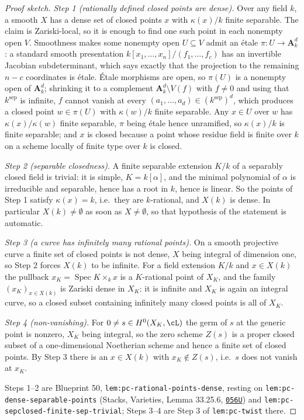 \documentclass[11pt]{article}
\theoremstyle{plain}
\theoremstyle{definition}
\DeclareMathOperator{\Spec}{Spec}
\begin{document}
\begin{proof}[Proof sketch]
\emph{Step 1 (rationally defined closed points are dense).}  Over any
field $k$, a smooth $X$ has a dense set of closed points $x$ with
$\kappa(x)/k$ finite separable.  The claim is Zariski-local, so it is
enough to find one such point in each nonempty open $V$.  Smoothness
makes some nonempty open $U\subseteq V$ admit an \'etale
$\pi:U\to\mathbf A^d_k$:  a standard smooth presentation
$k[x_1,\dots,x_n]/(f_1,\dots,f_c)$ has an invertible Jacobian
subdeterminant, which says exactly that the projection to the remaining
$n-c$ coordinates is \'etale.  \'Etale morphisms are open, so $\pi(U)$
is a nonempty open of $\mathbf A^d_k$;  shrinking it to a complement
$\mathbf A^d_k\setminus V(f)$ with $f\ne0$ and using that
$k^{\mathrm{sep}}$ is infinite, $f$ cannot vanish at every
$(a_1,\dots,a_d)\in(k^{\mathrm{sep}})^d$, which produces a closed point
$w\in\pi(U)$ with $\kappa(w)/k$ finite separable.  Any $x\in U$ over $w$
has $\kappa(x)/\kappa(w)$ finite separable, $\pi$ being \'etale hence
unramified, so $\kappa(x)/k$ is finite separable;  and $x$ is closed
because a point whose residue field is finite over $k$ on a scheme
locally of finite type over $k$ is closed.

\emph{Step 2 (separable closedness).}  A finite separable extension
$K/k$ of a separably closed field is trivial:  it is simple,
$K=k[\alpha]$, and the minimal polynomial of $\alpha$ is irreducible and
separable, hence has a root in $k$, hence is linear.  So the points of
Step 1 satisfy $\kappa(x)=k$, i.e.\ they are $k$-rational, and $X(k)$ is
dense.  In particular $X(k)\ne\emptyset$ as soon as $X\ne\emptyset$, so
that hypothesis of the statement is automatic.

\emph{Step 3 (a curve has infinitely many rational points).}  On a
smooth projective curve a finite set of closed points is not dense, $X$
being integral of dimension one, so Step 2 forces $X(k)$ to be infinite.
For a field extension $K/k$ and $x\in X(k)$ the pullback
$x_K=\Spec K\times_kx$ is a $K$-rational point of $X_K$, and the family
$(x_K)_{x\in X(k)}$ is Zariski dense in $X_K$:  it is infinite and $X_K$
is again an integral curve, so a closed subset containing infinitely
many closed points is all of $X_K$.

\emph{Step 4 (non-vanishing).}  For $0\ne s\in H^0(X_K,\cL)$ the germ of
$s$ at the generic point is nonzero, $X_K$ being integral, so the zero
scheme $Z(s)$ is a proper closed subset of a one-dimensional Noetherian
scheme and hence a finite set of closed points.  By Step 3 there is an
$x\in X(k)$ with $x_K\notin Z(s)$, i.e.\ $s$ does not vanish at $x_K$.

Steps 1--2 are Blueprint 50, \texttt{lem:pc-rational-points-dense},
resting on \texttt{lem:pc-dense-separable-points} (Stacks, Varieties,
Lemma 33.25.6, \href{https://stacks.math.columbia.edu/tag/056U}{\texttt{056U}}) and
\texttt{lem:pc-sepclosed-finite-sep-trivial};  Steps 3--4 are Step 3 of
\texttt{lem:pc-twist} there.
\end{proof}
\end{document}
